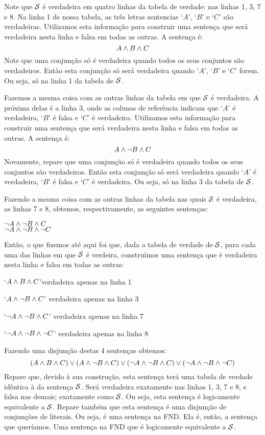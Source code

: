 \noindent Note que $\mathcal{S}$ é verdadeira em quatro linhas da tabela de verdade: nas linhas 1, 3, 7 e 8.
Na linha 1 de nossa tabela, as três letras sentencias `$A$', `$B$' e `$C$' são verdadeiras.
Utilizamos esta informação para construir uma sentença que será verdadeira nesta linha e falsa em todas as outras.
A sentença é: 
		$$A \wedge B \wedge C$$
Note que uma conjunção só é verdadeira quando todos os seus conjuntos são verdadeiros.
Então esta conjunção só será verdadeira quando `$A$', `$B$' e `$C$' forem.
Ou seja, só na linha 1 da tabela de $\mathcal{S}$.

Fazemos a mesma coisa com as outras linhas da tabela em que $\mathcal{S}$ é verdadeira.
A próxima delas  é a linha 3, onde as colunas de referência indicam que `$A$' é verdadeira, `$B$' é falsa e `$C$' é verdadeira.
Utilizamos esta informação para construir uma sentença que será verdadeira nesta linha e falsa em todas as outras.
A sentença é: 
		$$A \wedge \neg B \wedge C$$
Novamente, repare que uma conjunção só é verdadeira quando todos os seus conjuntos são verdadeiros. Então esta conjunção só será verdadeira quando `$A$' é verdadeira, `$B$' é falsa e `$C$' é verdadeira.
Ou seja, só na linha 3 da tabela de $\mathcal{S}$.

Fazendo a mesma coisa com as outras linhas da tabela nas quais $\mathcal{S}$ é verdadeira, as linhas 7 e 8, obtemos, respectivamente, as seguintes sentenças:
\begin{center}
		$\neg A \wedge \neg B \wedge C$ \\
		$\neg A \wedge \neg B \wedge \neg C$
\end{center}
Então, o que fizemos até aqui foi que, dada a tabela de verdade de $\mathcal{S}$, para cada uma das linhas em que $\mathcal{S}$ é verdeira, construímos uma sentença que é verdadeira nesta linha e falsa em todas as outras:
	\begin{earg}
		\item  `$A \wedge B \wedge C$'\hfill verdadeira apenas na linha 1
		\item `$A \wedge \neg B \wedge C$' \hfill verdadeira apenas na linha 3
		\item `$\neg A \wedge \neg B \wedge C$' \hfill verdadeira apenas na linha 7
		\item `$\neg A \wedge \neg B \wedge \neg C$' \hfill verdadeira apenas na linha 8
	\end{earg}
Fazendo uma disjunção destas 4 sentenças obtemos:
$$(A \wedge B \wedge C) \vee (A \wedge \neg B \wedge C) \vee (\neg A \wedge \neg B \wedge C) \vee (\neg A \wedge \neg B \wedge \neg C)$$
Repare que, devido à sua construção, esta sentença terá uma tabela de verdade idêntica à da sentença $\mathcal{S}$. Será verdadeira exatamente nas linhas 1, 3, 7 e 8, e falsa nas demais; exatamente como  $\mathcal{S}$.
Ou seja, esta sentença é logicamente equivalente a $\mathcal{S}$.
Repare também que esta sentença é uma disjunção de conjunções de literais. Ou seja, é uma sentença na FND.
Ela é, então, a sentença que queríamos.
Uma sentença na FND que é logicamente equivalente a $\mathcal{S}$.


